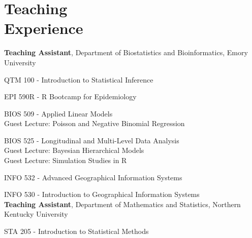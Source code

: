 \section{Teaching \\ Experience}

\textbf{Teaching Assistant}, Department of Biostatistics and Bioinformatics, Emory University \hfill

    \indent \quad QTM 100 - Introduction to Statistical Inference \hfill {}

    \indent \quad EPI 590R - R Bootcamp for Epidemiology \hfill {}
    
    \indent \quad BIOS 509 - Applied Linear Models \hfill {} \\
    \indent \qquad Guest Lecture: Poisson and Negative Binomial Regression
    
    \indent \quad BIOS 525 - Longitudinal and Multi-Level Data Analysis \hfill {} \\
    \indent \qquad Guest Lecture: Bayesian Hierarchical Models \\
    \indent \qquad Guest Lecture: Simulation Studies in R
    
    \indent \quad INFO 532 - Advanced Geographical Information Systems \hfill {}
    
    \indent \quad INFO 530 - Introduction to Geographical Information Systems \hfill {} \\

\textbf{Teaching Assistant}, Department of Mathematics and Statistics, Northern Kentucky University \hfill 

    \indent \quad STA 205 - Introduction to Statistical Methods \hfill {} \\